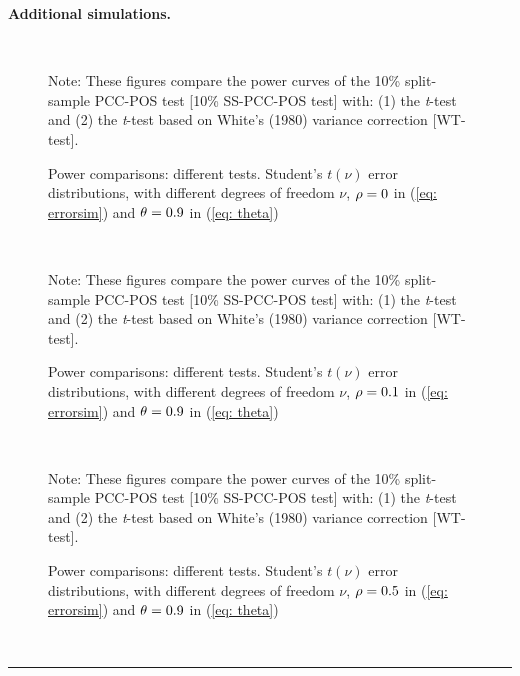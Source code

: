 \documentclass[harvard,11pt]{article}
\newenvironment{proof}[1][Proof]{\textbf{#1.} }{\  \rule{0.5em}{0.5em}}
\begin{document}
\newpage
\begin{proof}[Additional simulations]

\begin{figure}[tbph]
\caption{Power comparisons: different tests. Student's $t(\nu)$ error distributions, with
different degrees of freedom $\nu$, $\protect\rho=0$ in (\protect\ref{eq: errorsim}) and $\protect%
\theta =0.9$ in (\protect\ref{eq: theta})}
\begin{center}
 \\[0pt]
\end{center}
\doublespacing
Note: These figures compare the power curves of the 10\% split-sample PCC-POS test
[10\% SS-PCC-POS test] with: (1) the \textit{t}-test and (2) the \textit{t}-test based
on White's (1980) variance correction [WT-test]. 
\label{fig: c21}
\end{figure}
\FloatBarrier

\begin{figure}[tbph]
\caption{Power comparisons: different tests. Student's $t(\nu)$ error distributions, with
different degrees of freedom $\nu$, $\protect\rho=0.1$ in (\protect\ref{eq: errorsim}) and $\protect%
\theta =0.9$ in (\protect\ref{eq: theta})}
\begin{center}
 \\[0pt]
\end{center}
\doublespacing
Note: These figures compare the power curves of the 10\% split-sample PCC-POS test
[10\% SS-PCC-POS test] with: (1) the \textit{t}-test and (2) the \textit{t}-test based
on White's (1980) variance correction [WT-test]. 
\label{fig: c22}
\end{figure}
\FloatBarrier

\begin{figure}[tbph]
\caption{Power comparisons: different tests. Student's $t(\nu)$ error distributions, with
different degrees of freedom $\nu$, $\protect\rho=0.5$ in (\protect\ref{eq: errorsim}) and $\protect%
\theta =0.9$ in (\protect\ref{eq: theta})}
\begin{center}
 \\[0pt]
\end{center}
\doublespacing
Note: These figures compare the power curves of the 10\% split-sample PCC-POS test
[10\% SS-PCC-POS test] with: (1) the \textit{t}-test and (2) the \textit{t}-test based
on White's (1980) variance correction [WT-test].  
\label{fig: c23}
\end{figure}
\FloatBarrier


\end{proof}
\end{document}
